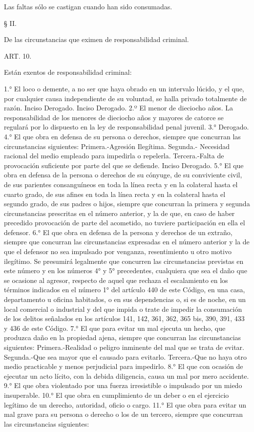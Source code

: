     Las faltas sólo se castigan cuando han sido consumadas.



    § II.

    De las circunstancias que eximen de responsabilidad criminal.


    ART. 10.

    Están exentos de responsabilidad criminal:

    1.° El loco o demente, a no ser que haya obrado en un intervalo lúcido, y el que, por cualquier causa independiente de su voluntad, se halla privado totalmente de razón.
    Inciso Derogado.
    Inciso Derogado.
    2.º El menor de dieciocho años. La responsabilidad de los menores de dieciocho años y mayores de catorce se regulará por lo dispuesto en la ley de responsabilidad penal juvenil.
    3.° Derogado.
    4.° El que obra en defensa de su persona o derechos, siempre que concurran las circunstancias siguientes:
    Primera.-Agresión Ilegítima.
    Segunda.- Necesidad racional del medio empleado para impedirla o repelerla.
    Tercera.-Falta de provocación suficiente por parte del que se defiende.
    Inciso Derogado.
    5.° El que obra en defensa de la persona o derechos de su cónyuge, de su conviviente civil, de sus parientes consanguíneos en toda la línea recta y en la colateral hasta el cuarto grado, de sus afines en toda la línea recta y en la colateral hasta el segundo grado, de sus padres o hijos, siempre que concurran la primera y segunda circunstancias prescritas en el número anterior, y la de que, en caso de haber precedido provocación de parte del acometido, no tuviere participación en ella el defensor.
    6.° El que obra en defensa de la persona y derechos de un extraño, siempre que concurran las circunstancias expresadas en el número anterior y la de que el defensor no sea impulsado por venganza, resentimiento u otro motivo ilegítimo.
    Se presumirá legalmente que concurren las circunstancias previstas en este número y en los números 4° y 5° precedentes, cualquiera que sea el daño que se ocasione al agresor, respecto de aquel que rechaza el escalamiento en los términos indicados en el número 1° del artículo 440 de este Código, en una casa, departamento u oficina habitados, o en sus dependencias o, si es de noche, en un local comercial o industrial y del que impida o trate de impedir la consumación de los delitos señalados en los artículos 141, 142, 361, 362, 365 bis, 390, 391, 433 y 436 de este Código.
    7.°  El que para evitar un mal ejecuta un hecho, que produzca daño en la propiedad ajena, siempre que concurran las circunstancias siguientes:
    Primera.-Realidad o peligro inminente del mal que se trata de evitar.
    Segunda.-Que sea mayor que el causado para evitarlo.
    Tercera.-Que no haya otro medio practicable y menos perjudicial para impedirlo.
    8.°  El que con ocasión de ejecutar un acto lícito, con la debida diligencia, causa un mal por mero accidente.
    9.°  El que obra violentado por una fuerza irresistible o impulsado por un miedo insuperable.
    10.° El que obra en cumplimiento de un deber o en el ejercicio legítimo de un derecho, autoridad, oficio o cargo.
    11.° El que obra para evitar un mal grave para su persona o derecho o los de un tercero, siempre que concurran las circunstancias siguientes:

